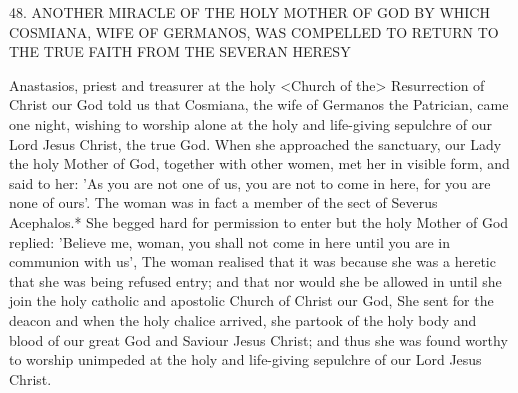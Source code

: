 48. ANOTHER MIRACLE OF THE HOLY MOTHER
OF GOD BY WHICH COSMIANA,
WIFE OF GERMANOS, WAS COMPELLED
TO RETURN TO THE TRUE FAITH
FROM THE SEVERAN HERESY

Anastasios, priest and treasurer at the holy <Church of the>
Resurrection of Christ our God told us that Cosmiana, the wife of
Germanos the Patrician, came one night, wishing to worship alone
at the holy and life-giving sepulchre of our Lord Jesus Christ, the
true God. When she approached the sanctuary, our Lady the holy
Mother of God, together with other women, met her in visible form,
and said to her: 'As you are not one of us, you are not to come in
here, for you are none of ours'. The woman was in fact a member
of the sect of Severus Acephalos.* She begged hard for permission
to enter but the holy Mother of God replied: 'Believe me, woman,
you shall not come in here until you are in communion with us',
The woman realised that it was because she was a heretic that she
was being refused entry; and that nor would she be allowed in until
she join the holy catholic and apostolic Church of Christ our God,
She sent for the deacon and when the holy chalice arrived, she
partook of the holy body and blood of our great God and Saviour
Jesus Christ; and thus she was found worthy to worship unimpeded
at the holy and life-giving sepulchre of our Lord Jesus Christ.

